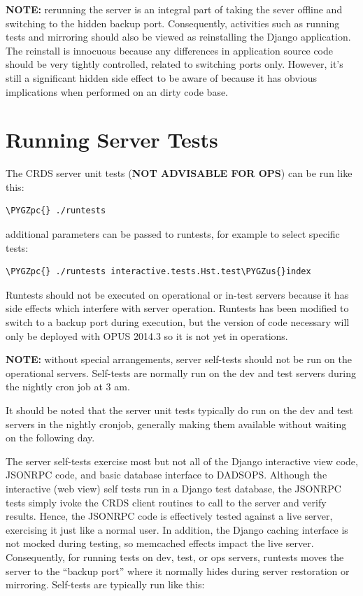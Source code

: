 \documentclass[letterpaper,10pt,english]{sphinxmanual}
\def\PYGZus{\char`\_}
\def\PYGZpc{\char`\%}
\begin{document}
\textbf{NOTE:}  rerunning the server is an integral part of taking the sever offline and switching to the hidden backup port.
Consequently,  activities such as running tests and mirroring should also be viewed as reinstalling the Django
application.   The reinstall is innocuous because any differences in application source code should be very tightly
controlled, related to switching ports only.   However,  it's still a significant hidden side effect to be aware of
because it has obvious implications when performed on an dirty code base.


\section{Running Server Tests}
\label{server_guide:running-server-tests}
The CRDS server unit tests (\textbf{NOT ADVISABLE FOR OPS}) can be run like this:

\begin{Verbatim}[commandchars=\\\{\}]
\PYGZpc{} ./runtests
\end{Verbatim}

additional parameters can be passed to runtests,  for example to select specific tests:

\begin{Verbatim}[commandchars=\\\{\}]
\PYGZpc{} ./runtests interactive.tests.Hst.test\PYGZus{}index
\end{Verbatim}

Runtests should not be executed on operational or in-test servers because it has side effects which interfere with
server operation.   Runtests has been modified to switch to a backup port during execution,  but the version of
code necessary will only be deployed with OPUS 2014.3 so it is not yet in operations.

\textbf{NOTE:}    without special arrangements,  server self-tests should not be run on the operational servers.
Self-tests are normally run on the dev and test servers during the nightly cron job at 3 am.

It should be noted that the server unit tests typically do run on the dev and test servers in the nightly
cronjob, generally making them available without waiting on the following day.

The server self-tests exercise most but not all of the Django interactive view code,  JSONRPC code, and basic database
interface to DADSOPS.   Although the interactive (web view) self tests run in a Django test database,  the JSONRPC
tests simply ivoke the CRDS client routines to call to the server and verify results.   Hence,  the JSONRPC code
is effectively tested against a live server,  exercising it just like a normal user.  In addition,  the Django
caching interface is not mocked during testing,  so memcached effects impact the live server.   Consequently,  for
running tests on dev, test, or ops servers,  runtests moves the server to the ``backup port'' where it normally hides
during server restoration or mirroring.   Self-tests are typically run like this:
\end{document}
